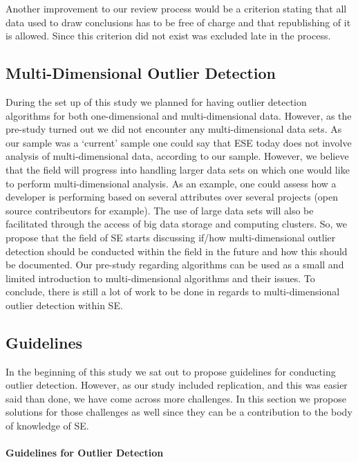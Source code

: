 Another improvement to our review process would be a criterion stating that all data used to draw conclusions has to be free of charge and that republishing of it is allowed. Since this criterion did not exist \citep{minku2013analysis} was excluded late in the process.




\subsection{Multi-Dimensional Outlier Detection}
During the set up of this study we planned for having outlier detection algorithms for both one-dimensional and multi-dimensional data. However, as the pre-study turned out we did not encounter any multi-dimensional data sets. As our sample was a `current' sample one could say that ESE today does not involve analysis of multi-dimensional data, according to our sample. However, we believe that the field will progress into handling larger data sets on which one would like to perform multi-dimensional analysis. As an example, one could assess how a developer is performing based on several attributes over several projects (open source contribeutors for example). The use of large data sets will also be facilitated through the access of big data storage and computing clusters. So, we propose that the field of SE starts discussing if\slash how multi-dimensional outlier detection should be conducted within the field in the future and how this should be documented. Our pre-study regarding algorithms can be used as a small and limited introduction to multi-dimensional algorithms and their issues. To conclude, there is still a lot of work to be done in regards to multi-dimensional outlier detection within SE\@.




\subsection{Guidelines}
\label{sec:discussion-guidelines}
In the beginning of this study we sat out to propose guidelines for conducting outlier detection. However, as our study included replication, and this was easier said than done, we have come across more challenges. In this section we propose solutions for those challenges as well since they can be a contribution to the body of knowledge of SE\@.




\paragraph{Guidelines for Outlier Detection}


